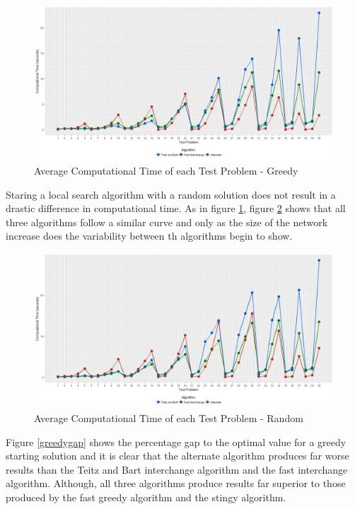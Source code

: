 \documentclass[11pt]{article}
\begin{document}
	\begin{figure}[H]
		\begin{center}
			\includegraphics[width=14cm]{greedytime.png}
			\caption{Average Computational Time of each Test Problem - Greedy}
			\label{greedytime}
		\end{center}
	\end{figure}
	
	Staring a local search algorithm with a random solution does not result in a drastic difference in computational time.  As in figure \ref{greedytime}, figure \ref{randomtime} shows that all three algorithms follow a similar curve and only as the size of the network increase does the variability between th algorithms begin to show.
	
	
	\begin{figure}[H]
		\begin{center}
			\includegraphics[width=14cm]{randomtime.png}
			\caption{Average Computational Time of each Test Problem - Random}
			\label{randomtime}
		\end{center}
	\end{figure}
	
	Figure \ref{greedygap} shows the percentage gap to the optimal value for a greedy starting solution and it is clear that the alternate algorithm produces far worse results than the Teitz and Bart interchange algorithm and the fast interchange algorithm.  Although, all three algorithms produce results far superior to those produced by the fast greedy algorithm and the stingy algorithm.
	
\end{document}
